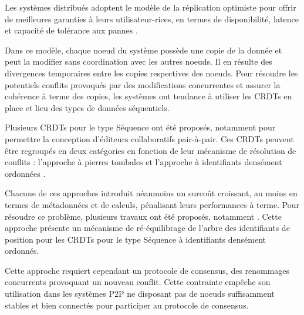 Les systèmes distribués adoptent le modèle de la réplication optimiste \cite{2005-optimistic-replication-saito} pour offrir de meilleures garanties à leurs utilisateur-rices, en termes de disponibilité, latence et capacité de tolérance aux pannes \cite{pacelc2012}.

Dans ce modèle, chaque noeud du système possède une copie de la donnée et peut la modifier sans coordination avec les autres noeuds.
Il en résulte des divergences temporaires entre les copies respectives des noeuds.
Pour résoudre les potentiels conflits provoqués par des modifications concurrentes et assurer la cohérence à terme des copies, les systèmes ont tendance à utiliser les \acp{CRDT} \cite{shapiro_2011_crdt} en place et lieu des types de données séquentiels.

Plusieurs \acp{CRDT} pour le type Séquence ont été proposés, notamment pour permettre la conception d'éditeurs collaboratifs pair-à-pair.
Ces \acp{CRDT} peuvent être regroupés en deux catégories en fonction de leur mécanisme de résolution de conflits : l'approche à pierres tombales \cite{2006-woot-oster,2007-wooto-weiss,2011-evaluation-crdts-ahmed-nacer,ROH2011354,briot:hal-01343941,2019-interleaving-anomalies-collaborative-editors-kleppmann} et l'approche à identifiants densément ordonnées \cite{2009-treedoc-preguica,2009-logoot-weiss,2010-logoot-undo-weiss,2013-logootsplit,2021-these-vic}.

Chacune de ces approches introduit néanmoins un surcoût croissant, au moins en termes de métadonnées et de calculs, pénalisant leurs performances à terme.
Pour résoudre ce problème, plusieurs travaux ont été proposés, notamment \cite{letia:hal-01248270, zawirski:hal-01248197}.
Cette approche présente un mécanisme de ré-équilibrage de l'arbre des identifiants de position pour les \acp{CRDT} pour le type Séquence à identifiants densément ordonnés.

Cette approche requiert cependant un protocole de consensus, des renommages concurrents provoquant un nouveau conflit.
Cette contrainte empêche son utilisation dans les systèmes \ac{P2P} ne disposant pas de noeuds suffisamment stables et bien connectés pour participer au protocole de consensus.
